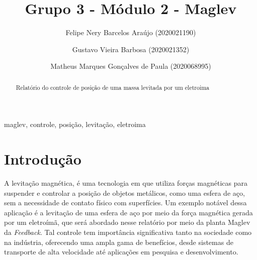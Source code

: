 \documentclass{ifacconf}
\begin{document}
\begin{frontmatter}

\title{Grupo 3 - Módulo 2 - Maglev} 


\author[First]{Felipe Nery Barcelos Araújo (2020021190)} 
\author[First]{Gustavo Vieira Barbosa (2020021352)} 
\author[First]{Matheus Marques Gonçalves de Paula (2020068995)}

\address[First]{
  Engenharia de Controle e Automação,\\ Universidade Federal de Minas Gerais, MG \\
   (e-mails: felipenery@ufmg.br, gustavovbarbosa@ufmg.br, mmgp@ufmg.br)
}

\begin{abstract}               
Relatório do controle de posição de uma massa levitada por um eletroima
\end{abstract}

\begin{keyword}
maglev, controle, posição, levitação, eletroima
\end{keyword}

\end{frontmatter}


\section{Introdução}

A levitação magnética, é uma tecnologia em que utiliza forças magnéticas para suspender e controlar a posição de
objetos metálicos, como uma esfera de aço, sem a necessidade de contato físico com superfícies. Um exemplo notável dessa aplicação é a levitação de uma esfera
de aço por meio da força magnética gerada por um eletroímã, que será abordado nesse relatório por meio da planta Maglev da \textit{Feedback}. Tal controle tem importância significativa 
tanto na sociedade como na indústria, oferecendo uma ampla gama de benefícios, desde sistemas de transporte de alta velocidade até aplicações em pesquisa e desenvolvimento.
\end{document}
